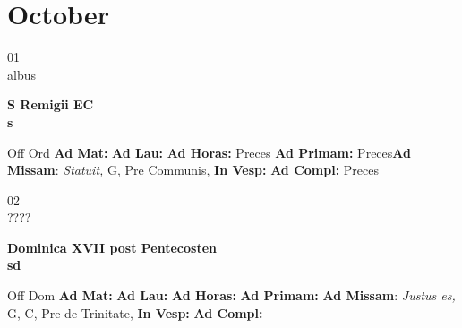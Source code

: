 \documentclass[10pt, openany]{book}
\begin{document}
    \chapter{October}
                    
    \begin{center}
        \begin{minipage}{3.5in}
            \vspace{2em}
            \begin{minipage}{0.5in}
                {\Huge 01} \\
                {\normalsize albus}
            \end{minipage}
            \begin{minipage}{3.0in}
                \textbf{ \large S Remigii EC \\
                \textnormal{\normalsize s}}

            \end{minipage}
            \begin{justify}Off Ord
                \textbf{Ad Mat: }
                \textbf{Ad Lau: }
                \textbf{Ad Horas: }Preces
                \textbf{Ad Primam: }Preces\textbf{Ad Missam}: \textit{Statuit,} G, Pre Communis, 
                \textbf{In Vesp: }
                \textbf{Ad Compl: }Preces
            \end{justify}
        \end{minipage}
    \end{center}

    \begin{center}
        \begin{minipage}{3.5in}
            \vspace{2em}
            \begin{minipage}{0.5in}
                {\Huge 02} \\
                {\normalsize ????}
            \end{minipage}
            \begin{minipage}{3.0in}
                \textbf{ \large Dominica XVII post Pentecosten \\
                \textnormal{\normalsize sd}}

            \end{minipage}
            \begin{justify}Off Dom
                \textbf{Ad Mat: }
                \textbf{Ad Lau: }
                \textbf{Ad Horas: }
                \textbf{Ad Primam: }\textbf{Ad Missam}: \textit{Justus es,} G, C, Pre de Trinitate, 
                \textbf{In Vesp: }
                \textbf{Ad Compl: }
            \end{justify}
        \end{minipage}
    \end{center}
\end{document}
